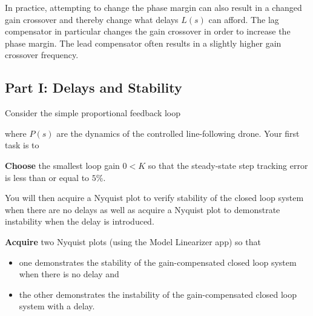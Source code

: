 In practice, attempting to change the phase margin can also result in a changed gain crossover and thereby change what delays \(L(s)\) can afford.
The lag compensator in particular changes the gain crossover in order to increase the phase margin.
The lead compensator often results in a slightly higher gain crossover frequency.

\subsection{Part I: Delays and Stability}
Consider the simple proportional feedback loop
%
\begin{center}
\end{center}
where \(P(s)\) are the dynamics of the controlled line-following drone.
Your first task is to
%
\begin{deliverable}[label={del:lab5:p1:1}]
  \textbf{Choose} the smallest loop gain \(0 < K\) so that the steady-state step tracking error is less than or equal to \(5\%.\)
\end{deliverable}
%
You will then acquire a Nyquist plot to verify stability of the closed loop system when there are no delays as well as acquire a Nyquist plot to demonstrate instability when the delay is introduced.
%
\begin{deliverable}[label={del:lab5:p1:2}]
  \textbf{Acquire} two Nyquist plots (using the Model Linearizer app) so that
  \begin{itemize}
    \item{one demonstrates the stability of the gain-compensated closed loop system when there is no delay and}
    \item{the other demonstrates the instability of the gain-compensated closed loop system with a delay.}
  \end{itemize}
\end{deliverable}
